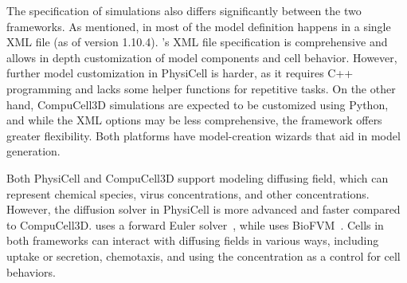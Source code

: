 
 The specification of simulations also differs significantly between the two frameworks. As mentioned, in \pscs most of the model definition happens in a single XML file (as of version 1.10.4). \psc's XML file specification is comprehensive and allows in depth customization of model components and cell behavior. However, further model customization in PhysiCell is harder, as it requires C++ programming and lacks some helper functions for repetitive tasks. 
 On the other hand, CompuCell3D simulations are expected to be customized using Python, and while the XML options may be less comprehensive, the framework offers greater flexibility. Both platforms have model-creation wizards that aid in model generation.%


 Both PhysiCell and CompuCell3D support modeling diffusing field, which can represent chemical species, virus concentrations, and other concentrations. However, the diffusion solver in PhysiCell is more advanced and faster compared to CompuCell3D. \ccds uses a forward Euler solver~\cite{swat_multi-scale_2012}, while \pscs uses BioFVM~\cite{ghaffarizadeh_physicell_2018, ghaffarizadeh_biofvm_2016}.
 Cells in both frameworks can interact with diffusing fields in various ways, including uptake or secretion, chemotaxis, and using the concentration as a control for cell behaviors.



